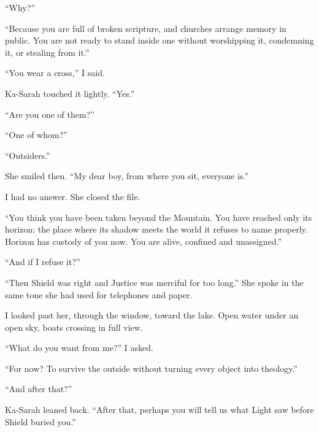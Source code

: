 ``Why?''\par

``Because you are full of broken scripture, and churches arrange memory in public. You are not ready to stand inside one without worshipping it, condemning it, or stealing from it.''\par

``You wear a cross,'' I said.\par

Ka-Sarah touched it lightly. ``Yes.''\par

``Are you one of them?''\par

``One of whom?''\par

``Outsiders.''\par

She smiled then. ``My dear boy, from where you sit, everyone is.''\par

I had no answer. She closed the file.\par

``You think you have been taken beyond the Mountain. You have reached only its horizon: the place where its shadow meets the world it refuses to name properly. Horizon has custody of you now. You are alive, confined and unassigned.''\par

``And if I refuse it?''\par

``Then Shield was right and Justice was merciful for too long.'' She spoke in the same tone she had used for telephones and paper.\par

I looked past her, through the window, toward the lake. Open water under an open sky, boats crossing in full view.\par

``What do you want from me?'' I asked.\par

``For now? To survive the outside without turning every object into theology.''\par

``And after that?''\par

Ka-Sarah leaned back. ``After that, perhaps you will tell us what Light saw before Shield buried you.''\par

